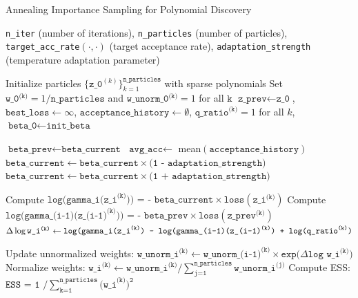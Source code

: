 \documentclass[11pt,a4paper]{article}
\begin{document}
\begin{algorithm}
	\caption{Annealing Importance Sampling for Polynomial Discovery}
	\label{alg:annealing-is}
	\begin{algorithmic}[1]
		\Require \texttt{n\_iter} (number of iterations), \texttt{n\_particles} (number of particles), \texttt{target\_acc\_rate}$(\cdot,\cdot)$ (target acceptance rate), \texttt{adaptation\_strength} (temperature adaptation parameter)
		
		\State Initialize particles $\{\texttt{z\_0}^{(k)}\}_{k=1}^{\texttt{n\_particles}}$ with sparse polynomials
		\State Set $\texttt{w\_0}^{\texttt{(k)}} = 1/\texttt{n\_particles}$ and $\texttt{w\_unorm\_0}^{\texttt{(k)}} = 1$ for all $\texttt k$ 
		\State $\texttt{z\_prev} \leftarrow \texttt{z\_0}$, $\texttt{best\_loss} \leftarrow \infty$, $\texttt{acceptance\_history} \leftarrow \emptyset$, $\texttt{q\_ratio}^{\texttt{(k)}}=1$ for all $k$, $\texttt{beta\_0} \leftarrow \texttt{init\_beta}$ 
		
		 
		\State $\texttt{beta\_{prev}} \leftarrow \texttt{beta\_current}$
		\State $\texttt{avg\_acc} \leftarrow$ mean$(\texttt{acceptance\_history})$ 
		\State $\texttt{beta\_current} \leftarrow \texttt{beta\_current} \times \texttt{(1 - adaptation\_strength)}$
		\State $\texttt{beta\_current} \leftarrow \texttt{beta\_current} \times \texttt{(1 + adaptation\_strength)}$
		\EndIf
		
		 
		\State Compute $\texttt{log(gamma\_i(z\_i}^{\texttt{(k)}} \texttt{)) = - beta\_current} \times \texttt{loss}(\texttt{z\_i}^{\texttt{(k)}}) $
		\State Compute $\texttt{log(gamma\_(i-1)}(\texttt{z\_(i-1)}^{\texttt{(k)}}\texttt{)) = - beta\_prev} \times \texttt{loss}(\texttt{z\_prev}^{\texttt{(k)}})$
		\State $\Delta \log \texttt{w\_i}^{\texttt{(k)}} \leftarrow \texttt{log(gamma\_i(\texttt{z\_i}}^{\texttt{(k)}}  \texttt{) - log(gamma\_(i-1)(z\_(i-1)}^{\texttt{(k)}} \texttt{) + log(q\_ratio}^{\texttt{(k)}}\texttt)$
		\EndFor
		
		\State Update unnormalized weights: $\texttt{w\_unorm\_i}^{\texttt{(k)}} \leftarrow \texttt{w\_unorm\_(i-1)}^{\texttt{(k)}} \times \texttt{exp(}\Delta \texttt{log w\_i}^{\texttt{(k)}}\texttt)$
		\State Normalize weights: $\texttt{w\_i}^{\texttt{(k)}} \leftarrow \texttt{w\_unorm\_i}^{\texttt{(k)}} \texttt/ \sum_{\texttt{j=1}}^{\texttt{n\_particles}} \texttt{w\_unorm\_i}^{\texttt{(j)}}$
		\State Compute ESS: $\texttt{ESS = 1 /} \sum_{\texttt{k=1}}^{\texttt{n\_particles}} \texttt{(w\_i}^{\texttt{(k)}})^\texttt2$
		

\end{algorithmic}
\end{algorithm}
\end{document}
